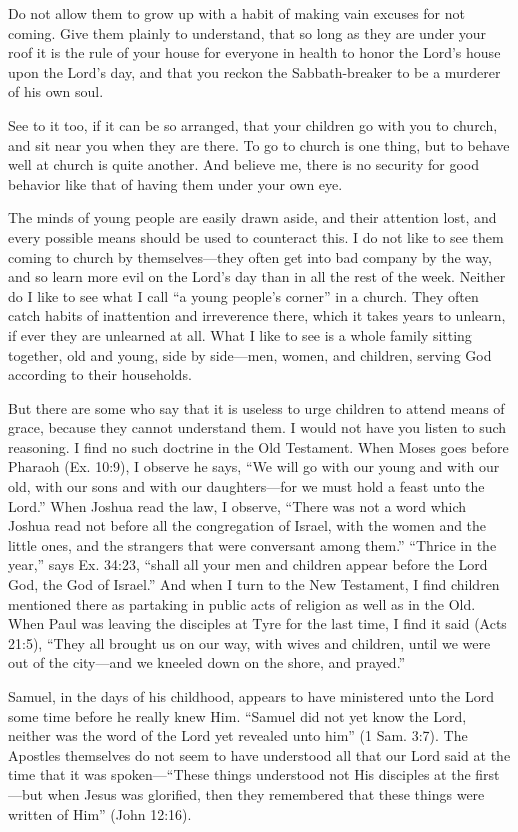 \documentclass[
]{book}
\begin{document}
Do not allow them to grow up with a habit of making vain excuses for not coming. Give them plainly to understand, that so long as they are under your roof it is the rule of your house for everyone in health to honor the Lord's house upon the Lord's day, and that you reckon the Sabbath-breaker to be a murderer of his own soul.

See to it too, if it can be so arranged, that your children go with you to church, and sit near you when they are there. To go to church is one thing, but to behave well at church is quite another. And believe me, there is no security for good behavior like that of having them under your own eye.

The minds of young people are easily drawn aside, and their attention lost, and every possible means should be used to counteract this. I do not like to see them coming to church by themselves---they often get into bad company by the way, and so learn more evil on the Lord's day than in all the rest of the week. Neither do I like to see what I call ``a young people's corner'' in a church. They often catch habits of inattention and irreverence there, which it takes years to unlearn, if ever they are unlearned at all. What I like to see is a whole family sitting together, old and young, side by side---men, women, and children, serving God according to their households.

But there are some who say that it is useless to urge children to attend means of grace, because they cannot understand them. I would not have you listen to such reasoning. I find no such doctrine in the Old Testament. When Moses goes before Pharaoh (Ex. 10:9), I observe he says, ``We will go with our young and with our old, with our sons and with our daughters---for we must hold a feast unto the Lord.'' When Joshua read the law, I observe, ``There was not a word which Joshua read not before all the congregation of Israel, with the women and the little ones, and the strangers that were conversant among them.'' ``Thrice in the year,'' says Ex. 34:23, ``shall all your men and children appear before the Lord God, the God of Israel.'' And when I turn to the New Testament, I find children mentioned there as partaking in public acts of religion as well as in the Old. When Paul was leaving the disciples at Tyre for the last time, I find it said (Acts 21:5), ``They all brought us on our way, with wives and children, until we were out of the city---and we kneeled down on the shore, and prayed.''

Samuel, in the days of his childhood, appears to have ministered unto the Lord some time before he really knew Him. ``Samuel did not yet know the Lord, neither was the word of the Lord yet revealed unto him'' (1 Sam. 3:7). The Apostles themselves do not seem to have understood all that our Lord said at the time that it was spoken---``These things understood not His disciples at the first---but when Jesus was glorified, then they remembered that these things were written of Him'' (John 12:16).
\end{document}
